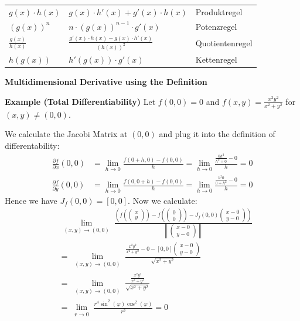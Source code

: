 \documentclass{sciposter}
\newcommand{\norm}[1]{\left\lVert#1\right\rVert}
\newcommand{\psection}[1]{\par \textbf{\large#1}}
\begin{document}
\begin{multicols}{2}
{\begin{table}[]
\begin{tabular}{@{} p{} p{} p{} @{}}
			\midrule
			$g(x) \cdot h(x)$ & $g(x) \cdot h'(x) + g'(x) \cdot h(x)$ & Produktregel\\
			$\left(g(x)\right)^n$ & $n \cdot \left( g(x) \right)^{n-1} \cdot g'(x)$ & Potenzregel\\
			$\frac{g(x)}{h(x)}$ & $\frac{ g'(x) \cdot h(x) - g(x)\cdot h'(x)}{\left(h(x)\right) ^2}$ & Quotientenregel\\
			$h(g(x))$ & $h'(g(x)) \cdot g'(x)$ & Kettenregel\\
			\bottomrule
		\end{tabular}
	\end{table}
}


\psection{Multidimensional Derivative using the Definition}


\textbf{Example (Total Differentiability)}
Let $f(0,0) = 0$ and $f(x,y) = \frac{x^2 y^2}{x^2+y^2}$ for $(x,y)\neq (0,0)$. 

We calculate the Jacobi Matrix at $(0,0)$ and plug it into the definition of differentability:
\begin{align*}
\frac{\partial f}{\partial x}(0,0) &= \lim\limits_{h \to 0}\frac{f(0+h,0) -f(0,0)}{h} = \lim\limits_{h \to 0} \frac{\frac{0h^2}{h^2 + 0} - 0}{h} = 0\\
\frac{\partial f}{\partial y}(0,0) &= \lim\limits_{h \to 0}\frac{f(0,0+h) -f(0,0)}{h} = \lim\limits_{h \to 0} \frac{\frac{h^2 0}{0+h^2} - 0}{h} = 0
\end{align*}
Hence we have $J_f (0,0) = \left[0,0\right]$. Now we calculate:
\begin{align*}
&\lim\limits_{\substack{(x,y)\to (0,0)}} \frac{\left(f\left(\begin{pmatrix}
	x \\ y
	\end{pmatrix}\right) -f\left(\begin{pmatrix}
	0 \\ 0
	\end{pmatrix}\right) - J_f(0,0)\begin{pmatrix}
	x-0 \\ y -0
	\end{pmatrix}\right)}{\norm{\begin{pmatrix}
		x -0 \\ y -0
		\end{pmatrix}}} \\
&= \lim\limits_{\substack{(x,y)\to (0,0)}} \frac{\frac{x^2 y^2}{x^2 + y^2} - 0 - \left[0,0\right] \begin{pmatrix}
	x-0 \\ y -0
	\end{pmatrix}}{ \sqrt{x^2 + y^2} }\\
&= \lim\limits_{\substack{(x,y)\to (0,0)}} \frac{\frac{x^2 y^2}{x^2 + y^2}}{ \sqrt{x^2 + y^2} }\\
&=  \lim\limits_{\substack{r \to 0}} \frac{r^4 \sin^2(\varphi) \cos^2(\varphi) }{r^3} = 0
\end{align*}



\vfill\null




\end{multicols}
\end{document}
